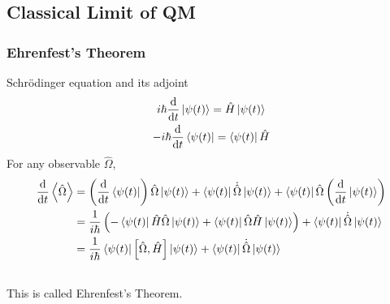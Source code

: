 \documentclass[letterpaper,10pt,english]{sphinxmanual}
\def\d{{\rm d}}
\newcommand{\bra}[1]{\left\langle #1\right|}
\newcommand{\ket}[1]{\left| #1\right\rangle}
\begin{document}
\subsection{Classical Limit of QM}
\label{QuantumMechanics:classical-limit-of-qm}

\subsubsection{Ehrenfest's Theorem}
\label{QuantumMechanics:ehrenfest-s-theorem}
Schrödinger equation and its adjoint
\begin{gather}
\begin{split}i\hbar \frac{\d }{\d t} \ket{\psi(t)} = \hat H \ket{\psi(t)}\end{split}\notag\\\begin{split}-i\hbar \frac{\d }{\d t} \bra{\psi(t)} = \bra{\psi(t)} \hat H\end{split}\notag
\end{gather}
For any observable $\hat \Omega$,
\begin{gather}
\begin{split}\frac{\d }{\d t}\left<\hat \Omega \right > & =  \left( \frac{\d}{\d t}\bra{\psi(t)}\right)  \hat \Omega \ket{\psi(t)} + \bra{\psi(t)} \dot{\hat \Omega} \ket{\psi(t)} + \bra{\psi(t)} \hat \Omega \left( \frac{\d}{\d t}\ket{\psi(t)}\right)  \\
& =  \frac{1}{i\hbar} \left ( - \bra{\psi(t)} \hat H \hat\Omega \ket{\psi(t)} +\bra{\psi(t)} \hat\Omega \hat H \ket{\psi(t)} \right) + \bra{\psi(t)} \dot{\hat \Omega} \ket{\psi(t)} \\
& =  \frac{1}{i\hbar} \bra{\psi(t)}\left[\hat\Omega,\hat H\right] \ket{\psi(t)}+\bra{\psi(t)} \dot{\hat \Omega} \ket{\psi(t)}\end{split}\notag\\\begin{split}\end{split}\notag
\end{gather}
This is called Ehrenfest's Theorem.
\end{document}
